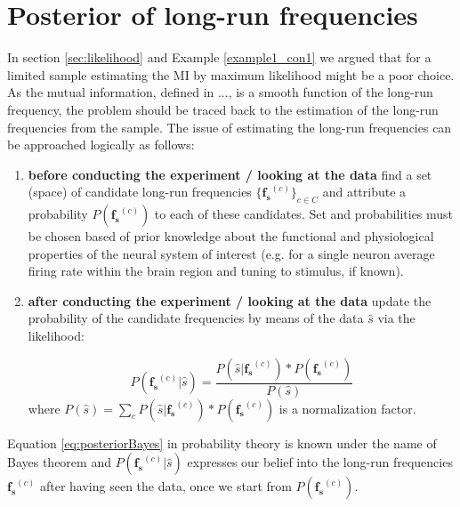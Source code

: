 \section{Posterior of long-run frequencies}\label{sec:pos_long-run}

In section \ref{sec:likelihood} and Example \ref{example1_con1} we argued that for a limited sample estimating the MI by maximum likelihood might be a poor choice. As the mutual information, defined in ..., is a smooth function of the long-run frequency, the problem should be traced back to the estimation of the long-run frequencies from the sample. The issue of estimating the long-run frequencies can be approached logically as follows: 

\begin{enumerate}

\item \textbf{before conducting the experiment / looking at the data} find a set (space) of candidate long-run frequencies $\{\mathbf{f_s}^{(c)}\}_{c \in C}$ and attribute a probability $P(\mathbf{f_s}^{(c)})$ to each of these candidates. Set and probabilities must be chosen based of prior knowledge about the functional and physiological properties of the neural system of interest (e.g. for a single neuron average firing rate within the brain region and tuning to stimulus, if known). 

\item \textbf{after conducting the experiment / looking at the data} update the probability of the candidate frequencies by means of the data $\hat{s}$ via the likelihood:

\begin{equation}
P(\mathbf{f_s}^{(c)}\vert\hat{s})=\frac{P(\hat{s}\vert \mathbf{f_s}^{(c)})*P(\mathbf{f_s}^{(c)})}{P(\hat{s})}
\label{eq:posteriorBayes}
\end{equation}
where $P(\hat{s})=\sum_c P(\hat{s}\vert \mathbf{f_s}^{(c)})*P(\mathbf{f_s}^{(c)})$ is a normalization factor.

\end{enumerate} 

Equation \eqref{eq:posteriorBayes} in probability theory is known under the name of Bayes theorem and $P(\mathbf{f_s}^{(c)}\vert\hat{s})$ expresses our belief into the long-run frequencies $\mathbf{f_s}^{(c)}$ after having seen the data, once we start from $P(\mathbf{f_s}^{(c)})$. 

